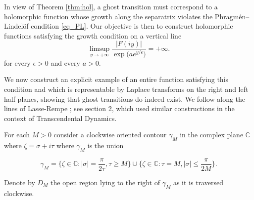 \documentclass[12pt]{article}
\theoremstyle{definition}
\begin{document}
In view of Theorem \ref{thm:hol}, a ghost transition must correspond to a holomorphic function whose growth along the separatrix violates the Phragm\'{e}n--Lindel\"{o}f condition \eqref{eq_PL}.
Our objective is then to construct holomorphic functions satisfying the growth condition on a vertical line  
\begin{equation}\label{eq:condition}
\limsup_{y\to+\infty}
\frac{|F(iy)|}{\exp\!\big(ae^{y/\epsilon}\big)}
=
+\infty.
\end{equation}
for every $\epsilon>0$ and every $a>0$.

We now construct an explicit example of an entire function satisfying this condition and which is representable by Laplace transforms on the right and left half-planes, showing that ghost transitions do indeed exist. We follow along the lines of Lasse-Rempe \cite{Rempe}; see section 2, which used similar constructions in the context of Transcendental Dynamics.

For each $M>0$ consider a clockwise oriented contour $\gamma_M$ in the complex plane $\mathbb{C}$ where $\zeta=\sigma+i \tau$ where $\gamma_M$ is the union

\begin{equation*}\label{eq:gammaM} \gamma_M= \bigg \{\zeta \in \mathbb{C}: |\sigma|= \frac{\pi}{2 \tau}, \tau\geq M  \bigg \} \cup \bigg \{\zeta \in \mathbb{C}: \tau=M, |\sigma| \leq \frac{\pi}{2M} \bigg \}.\end{equation*}


\noindent Denote by $D_M$ the open region lying to the right of $\gamma_M$ as it is traversed clockwise.

\begin{center}
\end{center}
\end{document}

